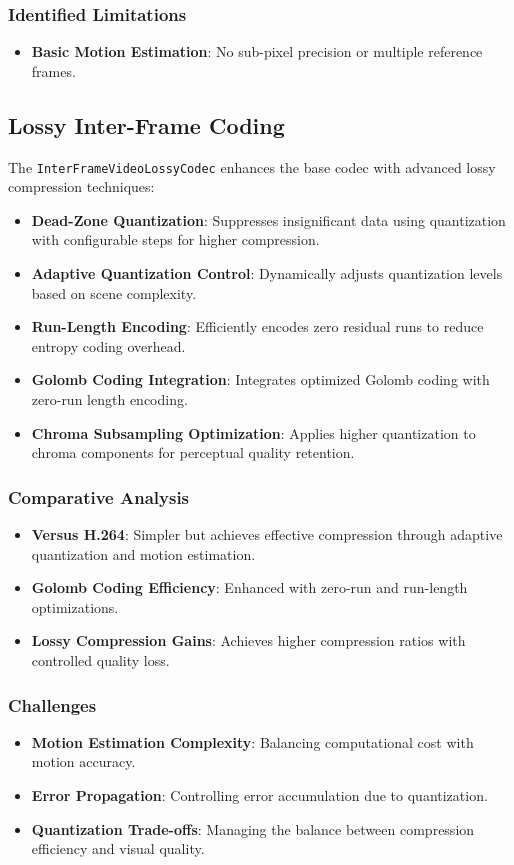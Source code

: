 \documentclass[a4paper,14pt]{article}
\begin{document}
\subsubsection{Identified Limitations}
\begin{itemize}
\item \textbf{Basic Motion Estimation}: No sub-pixel precision or multiple reference frames.
\end{itemize}

\subsection{Lossy Inter-Frame Coding}
The \texttt{InterFrameVideoLossyCodec} enhances the base codec with advanced lossy compression techniques:

\begin{itemize}
\item \textbf{Dead-Zone Quantization}: Suppresses insignificant data using quantization with configurable steps for higher compression.
\item \textbf{Adaptive Quantization Control}: Dynamically adjusts quantization levels based on scene complexity.
\item \textbf{Run-Length Encoding}: Efficiently encodes zero residual runs to reduce entropy coding overhead.
\item \textbf{Golomb Coding Integration}: Integrates optimized Golomb coding with zero-run length encoding.
\item \textbf{Chroma Subsampling Optimization}: Applies higher quantization to chroma components for perceptual quality retention.
\end{itemize}

\subsubsection{Comparative Analysis}
\begin{itemize}
\item \textbf{Versus H.264}: Simpler but achieves effective compression through adaptive quantization and motion estimation.
\item \textbf{Golomb Coding Efficiency}: Enhanced with zero-run and run-length optimizations.
\item \textbf{Lossy Compression Gains}: Achieves higher compression ratios with controlled quality loss.
\end{itemize}

\subsubsection{Challenges}
\begin{itemize}
\item \textbf{Motion Estimation Complexity}: Balancing computational cost with motion accuracy.
\item \textbf{Error Propagation}: Controlling error accumulation due to quantization.
\item \textbf{Quantization Trade-offs}: Managing the balance between compression efficiency and visual quality.
\end{itemize}
\end{document}
